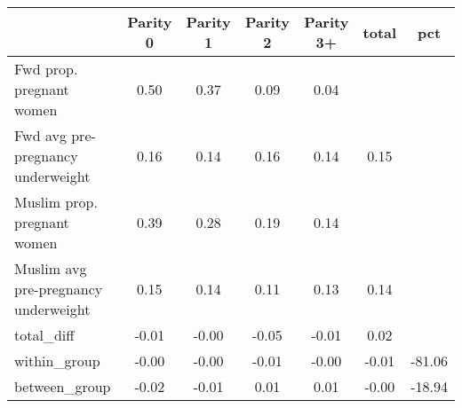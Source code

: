\begin{tabular}{l*{6}{c}}
\toprule
            &\multicolumn{1}{c}{Parity 0}&\multicolumn{1}{c}{Parity 1}&\multicolumn{1}{c}{Parity 2}&\multicolumn{1}{c}{Parity 3+}&\multicolumn{1}{c}{total}&\multicolumn{1}{c}{pct}\\
\midrule
\midrule
Fwd prop. pregnant women&        0.50&        0.37&        0.09&        0.04&            &            \\
Fwd avg pre-pregnancy underweight&        0.16&        0.14&        0.16&        0.14&        0.15&            \\
Muslim prop. pregnant women&        0.39&        0.28&        0.19&        0.14&            &            \\
Muslim avg pre-pregnancy underweight&        0.15&        0.14&        0.11&        0.13&        0.14&            \\
total\_diff  &       -0.01&       -0.00&       -0.05&       -0.01&        0.02&            \\
within\_group&       -0.00&       -0.00&       -0.01&       -0.00&       -0.01&      -81.06\\
between\_group&       -0.02&       -0.01&        0.01&        0.01&       -0.00&      -18.94\\
\bottomrule
\end{tabular}
